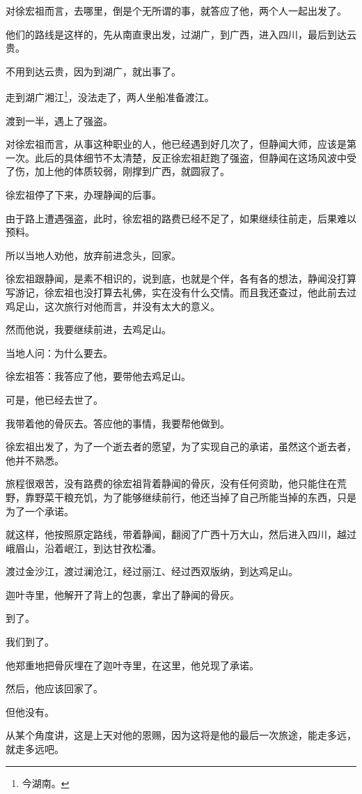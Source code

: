 \begin{multicols}{\theparacolNo}
对徐宏祖而言，去哪里，倒是个无所谓的事，就答应了他，两个人一起出发了。

他们的路线是这样的，先从南直隶出发，过湖广，到广西，进入四川，最后到达云贵。

不用到达云贵，因为到湖广，就出事了。

走到湖广湘江\footnote{今湖南。}，没法走了，两人坐船准备渡江。

渡到一半，遇上了强盗。

对徐宏祖而言，从事这种职业的人，他已经遇到好几次了，但静闻大师，应该是第一次。此后的具体细节不太清楚，反正徐宏祖赶跑了强盗，但静闻在这场风波中受了伤，加上他的体质较弱，刚撑到广西，就圆寂了。

徐宏祖停了下来，办理静闻的后事。

由于路上遭遇强盗，此时，徐宏祖的路费已经不足了，如果继续往前走，后果难以预料。

所以当地人劝他，放弃前进念头，回家。

徐宏祖跟静闻，是素不相识的，说到底，也就是个伴，各有各的想法，静闻没打算写游记，徐宏祖也没打算去礼佛，实在没有什么交情。而且我还查过，他此前去过鸡足山，这次旅行对他而言，并没有太大的意义。

然而他说，我要继续前进，去鸡足山。

当地人问：为什么要去。

徐宏祖答：我答应了他，要带他去鸡足山。

可是，他已经去世了。

我带着他的骨灰去。答应他的事情，我要帮他做到。

徐宏祖出发了，为了一个逝去者的愿望，为了实现自己的承诺，虽然这个逝去者，他并不熟悉。

旅程很艰苦，没有路费的徐宏祖背着静闻的骨灰，没有任何资助，他只能住在荒野，靠野菜干粮充饥，为了能够继续前行，他还当掉了自己所能当掉的东西，只是为了一个承诺。

就这样，他按照原定路线，带着静闻，翻阅了广西十万大山，然后进入四川，越过峨眉山，沿着岷江，到达甘孜松潘。

渡过金沙江，渡过澜沧江，经过丽江、经过西双版纳，到达鸡足山。

迦叶寺里，他解开了背上的包裹，拿出了静闻的骨灰。

到了。

我们到了。

他郑重地把骨灰埋在了迦叶寺里，在这里，他兑现了承诺。

然后，他应该回家了。

但他没有。

从某个角度讲，这是上天对他的恩赐，因为这将是他的最后一次旅途，能走多远，就走多远吧。


\end{multicols}
